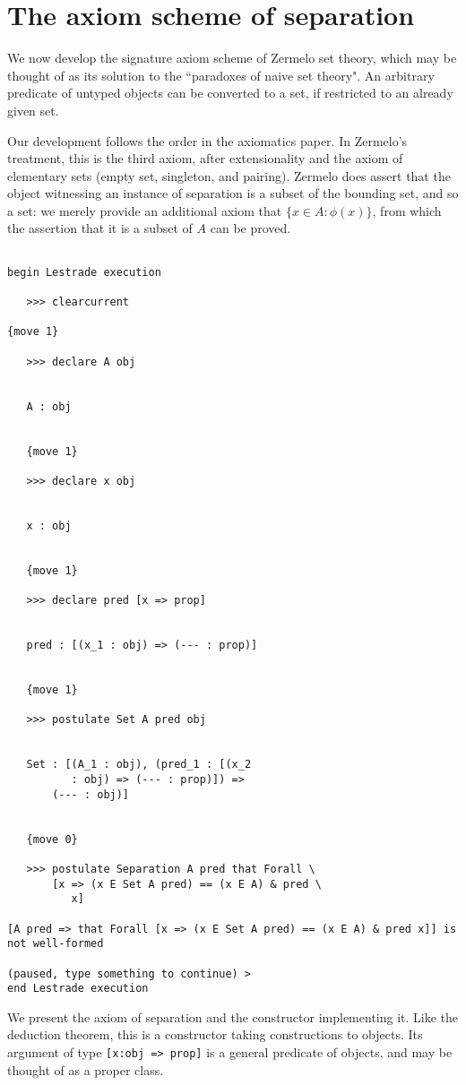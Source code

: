 \documentclass[12pt]{article}
\begin{document}
\section{The axiom scheme of separation}

We now develop the signature axiom scheme of Zermelo set theory, which may be thought of as its solution to the ``paradoxes of naive set theory".  An arbitrary predicate of untyped objects can be converted to a set, if restricted to an already given set.

Our development follows the order in the axiomatics paper.  In Zermelo's treatment, this is the third axiom, after extensionality and the axiom of elementary sets
(empty set, singleton, and pairing).  Zermelo does assert that the object witnessing an instance of separation is a subset of the bounding set, and so a set:  we merely provide
an additional axiom that $\{x \in A : \phi(x)\}$, from which the assertion that it is a subset of $A$ can be proved.

\begin{verbatim}

begin Lestrade execution

   >>> clearcurrent

{move 1}

   >>> declare A obj


   A : obj


   {move 1}

   >>> declare x obj


   x : obj


   {move 1}

   >>> declare pred [x => prop]


   pred : [(x_1 : obj) => (--- : prop)]


   {move 1}

   >>> postulate Set A pred obj


   Set : [(A_1 : obj), (pred_1 : [(x_2 
          : obj) => (--- : prop)]) => 
       (--- : obj)]


   {move 0}

   >>> postulate Separation A pred that Forall \
       [x => (x E Set A pred) == (x E A) & pred \
          x]

[A pred => that Forall [x => (x E Set A pred) == (x E A) & pred x]] is not well-formed

(paused, type something to continue) >
end Lestrade execution
\end{verbatim}

We present the axiom of separation and the constructor implementing it.  Like the deduction theorem, this is a constructor taking constructions to objects.
Its argument of type {\tt [x:obj => prop]} is a general predicate of objects, and may be thought of as a proper class.
\end{document}
